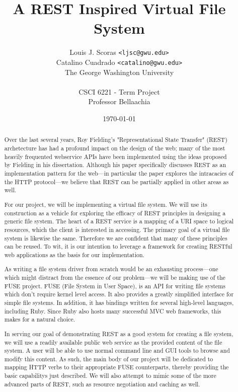 \documentclass{article}
\begin{document}
\title{A REST Inspired Virtual File System}
\author{Louis J. Scoras \texttt{<ljsc@gwu.edu>}\\
Catalino Cuadrado \texttt{<catalino@gwu.edu>}\\
The George Washington University\\
\\
CSCI 6221 - Term Project\\
Professor Bellaachia}
\date{\today}
\maketitle

\begin{abstract}

Over the last several years, Roy Fielding's "Representational State Transfer"
(REST) archetecture has had a profound impact on the design of the web; many of
the most heavily frequented webservice APIs have been implemented using the
ideas proposed by Fielding in his dissertation. Although his paper specifically
discusses REST as an implementation pattern for the web---in particular the
paper explores the intracacies of the HTTP protocol---we believe that REST can
be partially applied in other areas as well.

For our project, we will be implementing a virtual file system. We will use its
construction as a vehicle for exploring the efficacy of REST principles in
designing a generic file system. The heart of a REST service is a mapping of a
URI space to logical resources, which the client is interested in accessing.
The primary goal of a virtual file system is likewise the same. Therefore we are
confident that many of these principles can be reused. To wit, it is our
intention to leverage a framework for creating RESTful web applications as the
basis for our implementation.

As writing a file system driver from scratch would be an exhausting
process---one which might distract from the essence of our problem---we will be
making use of the FUSE project. FUSE (File System in User Space), is an API for
writing file systems which don't require kernel level access. It also provides a
greatly simplified interface for simple file systems. In addition, it has
bindings written for several high-level languages, including Ruby. Since Ruby
also hosts many successful MVC web frameworks, this makes for a natural choice.

In serving our goal of demonstrating REST as a good system for creating a file
system, we will use a readily available public web service as the provided
content of the file system. A user will be able to use normal command line and
GUI tools to browse and modify this content. As such, the main body of our
project will be dedicated to mapping HTTP verbs to their appropriate FUSE
counterparts, thereby providing the basic capabilitys just described. We will
also attempt to mimic some of the more advanced parts of REST, such as resource
negotiation and caching as well.

\end{abstract}
\end{document}
